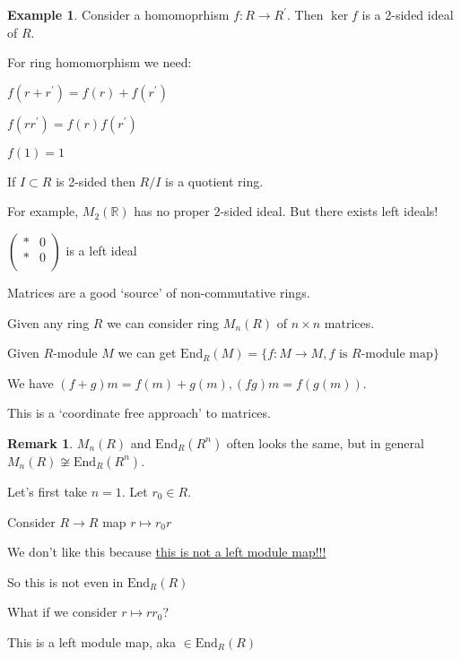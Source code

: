 \documentclass{article}
\theoremstyle{definition}
\newtheorem*{example}{Example}
\newtheorem*{remark}{Remark}
\begin{document}
\begin{example}

    Consider a homomoprhism \(f: R \to R^{\prime} \). Then \(\ker f\) is a 2-sided ideal of \(R\).

\end{example}

For ring homomorphism we need:

\(f(r+r^{\prime} )=f(r)+f(r^{\prime} )\) 

\(f(r r^{\prime} )=f(r)f(r^{\prime} )\) 

\(f(1)=1\) 

If \(I \subset R\) is 2-sided then \(R / I\) is a quotient ring.

For example, \(M_2(\mathbb{R})\) has no proper \(2\)-sided ideal. But there exists left ideals!

\(\begin{pmatrix}
    \ast &  0 \\
    \ast &  0 \\
\end{pmatrix}\) is a left ideal 

Matrices are a good `source' of non-commutative rings.

Given any ring \(R\) we can consider ring \(M_n(R)\) of \(n \times n\) matrices.

Given \(R\)-module \(M\) we can get \(\text{End}_R(M) = \{ f: M \to M, f \text{ is } R\text{-module map} \}\)

We have \((f+g)m=f(m)+g(m), (fg)m = f(g(m))\).

This is a `coordinate free approach' to matrices.

\begin{remark}

    \(M_n(R)\) and \(\text{End}_R(R^n)\) often looks the same, but in general \(M_n(R) \not\cong \text{End}_R(R^n)\).

\end{remark}

Let's first take \(n = 1\). Let \(r_0 \in R\).

Consider \(R \to R\) map \(r \mapsto r_0 r\) 

We don't like this because \underline{this is not a left module map!!!} 

So this is not even in \(\text{End}_R(R)\) 

What if we consider \(r \mapsto r r_0\)?

This is a left module map, aka \(\in \text{End}_R(R)\) 
\end{document}
